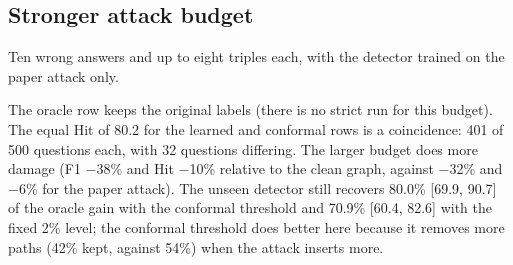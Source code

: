 \documentclass[preprint,12pt]{elsarticle}
\begin{document}
\subsection{Stronger attack budget}\label{sec:budget}
Ten wrong answers and up to eight triples each, with the detector trained on the paper attack only.
\begin{table}[tbp]
\centering\small
{}
\caption{Stronger attack budget ($N=10$, $K=8$), WebQSP-500, original labels (including the oracle), detector trained on the paper attack only.}
\end{table}
The oracle row keeps the original labels (there is no strict run for this budget). The equal Hit of 80.2 for the learned and conformal rows is a coincidence: 401 of 500 questions each, with 32 questions differing. The larger budget does more damage (F1 $-$38\% and Hit $-$10\% relative to the clean graph, against $-$32\% and $-$6\% for the paper attack). The unseen detector still recovers 80.0\% [69.9, 90.7] of the oracle gain with the conformal threshold and 70.9\% [60.4, 82.6] with the fixed 2\% level; the conformal threshold does better here because it removes more paths (42\% kept, against 54\%) when the attack inserts more.
\end{document}
